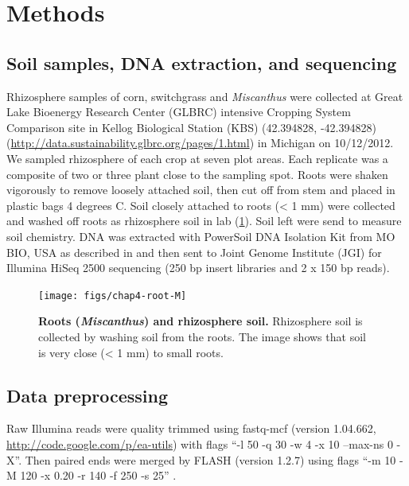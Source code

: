 \documentclass[]{msu-thesis}
\begin{document}
\section{Methods}

\subsection{Soil samples, DNA extraction, and sequencing}
Rhizosphere samples of corn, switchgrass and \textit{Miscanthus} were collected
at Great Lake Bioenergy Research Center (GLBRC) intensive Cropping
System Comparison site in Kellog Biological Station (KBS) (42.394828,
-42.394828) (\url{http://data.sustainability.glbrc.org/pages/1.html}) in
Michigan on 10/12/2012. We sampled rhizosphere of each crop at seven
plot areas.  Each replicate was a composite of two or three plant close
to the sampling spot. Roots were shaken vigorously to remove loosely
attached soil, then cut off from stem and placed in plastic bags 4
degrees C.  Soil closely attached to roots (< 1 mm) were collected and
washed off roots as rhizosphere soil in lab (\cref{fig:chap4FigS1}).
Soil left were send to measure soil chemistry. DNA was extracted with
PowerSoil DNA Isolation Kit from MO BIO, USA as described in
\cite{jesus_influence_2015} and then sent to Joint Genome Institute
(JGI) for Illumina HiSeq 2500 sequencing (250 bp insert libraries and 2
x 150 bp reads).

\begin{figure}[tbph!] 
  \centering
  \texttt{[image: figs/chap4-root-M]}
  \caption[Roots (\textit{Miscanthus}) and rhizosphere soil]{\textbf{Roots
    (\textit{Miscanthus}) and rhizosphere soil.} Rhizosphere soil is
    collected by washing soil from the roots. The image shows that soil
    is very close (< 1 mm) to small roots.} 
  \label{fig:chap4FigS1} 
\end{figure}


\subsection{Data preprocessing}
Raw Illumina reads were quality trimmed using fastq-mcf (version
1.04.662, \url{http://code.google.com/p/ea-utils}) with flags ``-l 50 -q
30 -w 4 -x 10 –max-ns 0 -X''. Then paired ends were merged by FLASH
(version 1.2.7) \cite{magoc_flash:_2011} using flags ``-m 10 -M 120 -x
0.20 -r 140 -f 250 -s 25'' \cite{guo_microbial_2015}.
\end{document}
